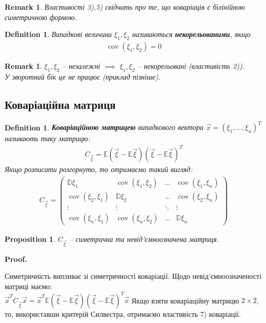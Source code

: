 \documentclass[a4paper, 10pt]{article}
\makeatletter
\theoremstyle{theoremdd}
\newtheorem{definition}[theorem]{Definition}
\newtheorem{proposition}[theorem]{Proposition}
\newtheorem{remark}[theorem]{Remark}
\renewenvironment{proof}[1][Proof.\\]{\par
\pushQED{\hfill \qed}%
\normalfont \topsep6\p@\@plus6\p@\relax
\trivlist
\item\relax
{\bfseries
#1\@addpunct{.}}\hspace\labelsep\ignorespaces
}{%
\popQED\endtrivlist\@endpefalse
}
\DeclareMathOperator{\cov}{cov}
\makeatother
\begin{document}
\begin{remark}
Властивості 3),5) свідчать про те, що коваріація є білінійною симетричною формою.
\end{remark}

\begin{definition}
Випадкові величини $\xi_1,\xi_2$ називаються \textbf{некорельованими}, якщо
\begin{align*}
\cov(\xi_1,\xi_2) = 0
\end{align*}
\end{definition}

\begin{remark}
$\xi_1,\xi_2$ -- незалежні $\implies$ $\xi_1,\xi_2$ -- некорельовані (властивість 2)).\\
У зворотний бік це не працює (приклад пізніше).
\end{remark}

\subsection{Коваріаційна матриця}
\begin{definition}
\textbf{Коваріаційною матрицею} випадкового вектора $\vec{x} = (\xi_1,\dots,\xi_n)^T$ називають таку матрицю:
\begin{align*}
C_{\vec{\xi}} = \mathbb{E}(\vec{\xi} - \mathbb{E}\vec{\xi})(\vec{\xi} - \mathbb{E}\vec{\xi})^T
\end{align*}
Якщо розписати розгорнуто, то отримаємо такий вигляд:
\begin{align*}
C_{\vec{\xi}} = \begin{pmatrix}
\mathbb{D}\xi_1 & \cov(\xi_1,\xi_2) & \dots & \cov(\xi_1,\xi_n) \\
\cov(\xi_2,\xi_1) & \mathbb{D}\xi_2 & \dots & \cov(\xi_2,\xi_n) \\
\vdots & \vdots & \ddots & \vdots \\
\cov(\xi_n,\xi_1) & \cov(\xi_n,\xi_2) & \dots & \mathbb{D}\xi_n  
\end{pmatrix}
\end{align*}
\end{definition}

\begin{proposition}
$C_{\vec{\xi}}$ -- симетрична та невід'ємноозначена матриця.
\end{proposition}

\begin{proof}
Симетричність випливає зі симетричності коваріації. Щодо невід'ємноозначеності матриці маємо:\\
$\vec{x}^T C_{\vec{\xi}} \vec{x} = \vec{x}^T \mathbb{E}(\vec{\xi}-\mathbb{E}\vec{\xi})(\vec{\xi}-\mathbb{E}\vec{\xi})^T \vec{x}$
\end{proof}
\noindent
Якщо взяти коваріаційну матрицю $2 \times 2$, то, використавши критерій Силвестра, отримаємо властивість 7) коваріації.
\end{document}
